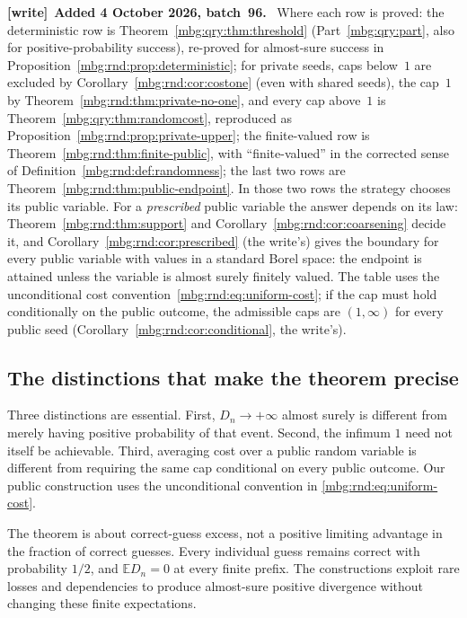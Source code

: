 \documentclass[11pt,letterpaper]{article}
\theoremstyle{definition}
\newcommand{\E}{\mathbb E}
\newenvironment{writenote}[1][]{\par\smallskip\begingroup\small
 \noindent\textbf{[write]}\if\relax\detokenize{#1}\relax\else~\textbf{#1.}\fi\ }%
 {\par\endgroup\smallskip}
\begin{document}
\begin{writenote}[Added 4 October 2026, batch~96]
Where each row is proved: the deterministic row is Theorem~\ref{mbg:qry:thm:threshold} (Part~\ref{mbg:qry:part}, also for positive-probability success), re-proved for almost-sure success in Proposition~\ref{mbg:rnd:prop:deterministic}; for private seeds, caps below~$1$ are excluded by Corollary~\ref{mbg:rnd:cor:costone} (even with shared seeds), the cap~$1$ by Theorem~\ref{mbg:rnd:thm:private-no-one}, and every cap above~$1$ is Theorem~\ref{mbg:qry:thm:randomcost}, reproduced as Proposition~\ref{mbg:rnd:prop:private-upper}; the finite-valued row is Theorem~\ref{mbg:rnd:thm:finite-public}, with ``finite-valued'' in the corrected sense of Definition~\ref{mbg:rnd:def:randomness}; the last two rows are Theorem~\ref{mbg:rnd:thm:public-endpoint}. In those two rows the strategy chooses its public variable. For a \emph{prescribed} public variable the answer depends on its law: Theorem~\ref{mbg:rnd:thm:support} and Corollary~\ref{mbg:rnd:cor:coarsening} decide it, and Corollary~\ref{mbg:rnd:cor:prescribed} (the write's) gives the boundary for every public variable with values in a standard Borel space: the endpoint is attained unless the variable is almost surely finitely valued. The table uses the unconditional cost convention~\eqref{mbg:rnd:eq:uniform-cost}; if the cap must hold conditionally on the public outcome, the admissible caps are $(1,\infty)$ for every public seed (Corollary~\ref{mbg:rnd:cor:conditional}, the write's).
\end{writenote}

\subsection{The distinctions that make the theorem precise}

Three distinctions are essential. First, $D_n\to+\infty$ almost surely
is different from merely having positive probability of that event.
Second, the infimum $1$ need not itself be achievable. Third, averaging
cost over a public random variable is different from requiring the same
cap conditional on every public outcome. Our public construction uses
the unconditional convention in \eqref{mbg:rnd:eq:uniform-cost}.

The theorem is about correct-guess excess, not a positive limiting
advantage in the fraction of correct guesses. Every individual guess
remains correct with probability $1/2$, and $\E D_n=0$ at every finite
prefix. The constructions exploit rare losses and dependencies to
produce almost-sure positive divergence without changing these finite
expectations.
\end{document}
